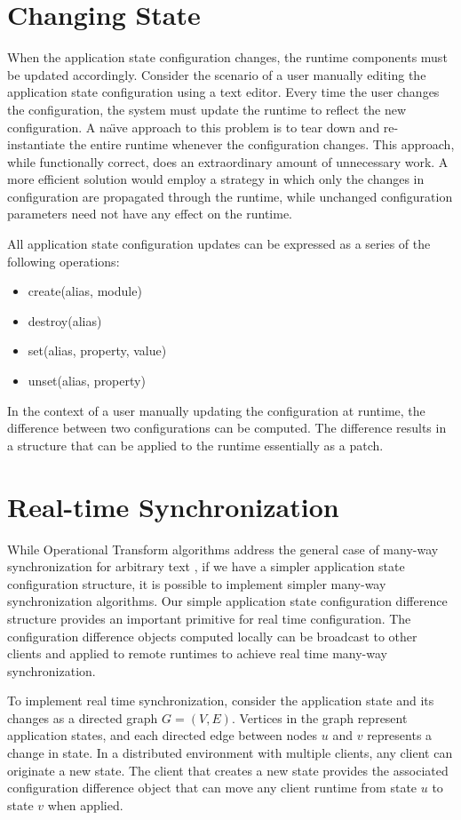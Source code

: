 \section{Changing State}
When the application state configuration changes, the runtime components must be updated accordingly. Consider the scenario of a user manually editing the application state configuration using a text editor. Every time the user changes the configuration, the system must update the runtime to reflect the new configuration. A na\"{\i}ve approach to this problem is to tear down and re-instantiate the entire runtime whenever the configuration changes. This approach, while functionally correct, does an extraordinary amount of unnecessary work. A more efficient solution would employ a strategy in which only the changes in configuration are propagated through the runtime, while unchanged configuration parameters need not have any effect on the runtime.

All application state configuration updates can be expressed as a series of the following operations:
\begin{itemize}
\item create(alias, module)
\item destroy(alias)
\item set(alias, property, value)
\item unset(alias, property)
\end{itemize}

In the context of a user manually updating the configuration at runtime, the difference between two configurations can be computed. The difference results in a structure that can be applied to the runtime essentially as a patch.

\section{Real-time Synchronization}
While Operational Transform algorithms address the general case of many-way synchronization for arbitrary text \cite{cormack1995counterexample}, if we have a simpler application state configuration structure, it is possible to implement simpler many-way synchronization algorithms. Our simple application state configuration difference structure provides an important primitive for real time configuration. The configuration difference objects computed locally can be broadcast to other clients and applied to remote runtimes to achieve real time many-way synchronization.

To implement real time synchronization, consider the application state and its changes as a directed graph $G = (V, E)$. Vertices in the graph represent application states, and each directed edge between nodes $u$ and $v$ represents a change in state. In a distributed environment with multiple clients, any client can originate a new state. The client that creates a new state provides the associated configuration difference object that can move any client runtime from state $u$ to state $v$ when applied.

